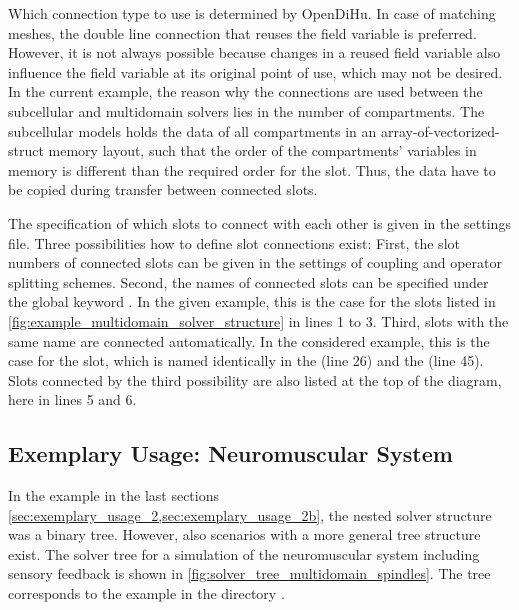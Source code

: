 Which connection type to use is determined by OpenDiHu. In case of matching meshes, the double line connection that reuses the field variable is preferred. However, it is not always possible because changes in a reused field variable also influence the field variable at its original point of use, which may not be desired. In the current example, the reason why the  connections are used between the subcellular and multidomain solvers lies in the number of compartments. The subcellular models holds the data of all compartments in an array-of-vectorized-struct memory layout, such that the order of the compartments' variables in memory is different than the required order for the slot. Thus, the data have to be copied during transfer between connected slots.

The specification of which slots to connect with each other is given in the settings file. Three possibilities how to define slot connections exist: First, the slot numbers of connected slots can be given in the settings of coupling and operator splitting schemes. Second, the names of connected slots can be specified under the global keyword . In the given example, this is the case for the slots listed in \cref{fig:example_multidomain_solver_structure} in lines 1 to 3. Third, slots with the same name are connected automatically. In the considered example, this is the case for the  slot, which is named identically in the  (line 26) and the  (line 45). Slots connected by the third possibility are also listed at the top of the diagram, here in lines 5 and 6.


\subsection{Exemplary Usage: Neuromuscular System}\label{sec:exemplary_usage_3}

In the example in the last sections \cref{sec:exemplary_usage_2,sec:exemplary_usage_2b}, the nested solver structure was a binary tree. However, also scenarios with a more general tree structure exist. The solver tree for a simulation of the neuromuscular system including sensory feedback is shown in \cref{fig:solver_tree_multidomain_spindles}. The tree corresponds to the example in the directory .

